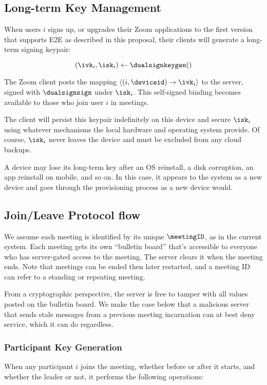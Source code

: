 \subsection{Long-term Key Management}

When users $i$ signs up, or upgrades their Zoom applications to the first version that supports E2E as described in this proposal, their clients will generate a long-term signing keypair:

\[
(\ivk_i, \isk_i) \leftarrow \dualsignkeygen()
\]

The Zoom client posts the mapping $\langle (i, \deviceid) \rightarrow \ivk_i \rangle$ to the server, signed with $\dualsignsign$ under $\isk_i$. This self-signed binding becomes available to those who join user $i$ in meetings.

The client will persist this keypair indefinitely on this device and secure $\isk_i$ using whatever mechanisms the local hardware and operating system provide. Of course, $\isk_i$ never leaves the device and must be excluded from any cloud backups.

A device may lose its long-term key after an OS reinstall, a disk corruption, an app reinstall on mobile, and so on. In this case, it appears to the system as a new device and goes through the provisioning process as a new device would.

\subsection{Join/Leave Protocol flow}

We assume each meeting is identified by its unique $\meetingID$, as in the current system. Each meeting gets its own ``bulletin board'' that's accessible to everyone who has server-gated access to the meeting. The server clears it when the meeting ends. Note that meetings can be ended then later restarted, and a meeting ID can refer to a standing or repeating meeting.

From a cryptographic perspective, the server is free to tamper with all values posted on the bulletin board. We make the case below that a malicious server that sends stale messages from a previous meeting incarnation can at best deny service, which it can do regardless.


\subsubsection{Participant Key Generation}
When any participant $i$ joins the meeting, whether before or after it starts, and whether the leader or not, it performs the following operations:

